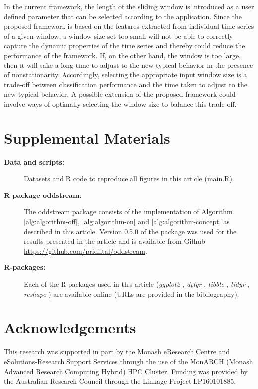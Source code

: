 \documentclass[12pt]{article}
\begin{document}
In the current framework, the length of the sliding window is introduced
as a user defined parameter that can be selected according to the
application. Since the proposed framework is based on the features
extracted from individual time series of a given window, a window size
set too small will not be able to correctly capture the dynamic
properties of the time series and thereby could reduce the performance
of the framework. If, on the other hand, the window is too large, then
it will take a long time to adjust to the new typical behavior in the
presence of nonstationarity. Accordingly, selecting the appropriate
input window size is a trade-off between classification performance and
the time taken to adjust to the new typical behavior. A possible
extension of the proposed framework could involve ways of optimally
selecting the window size to balance this trade-off.

\hypertarget{supplemental-materials}{%
\section{Supplemental Materials}\label{supplemental-materials}}

\begin{description}

\item[\textbf{Data and scripts:}] Datasets and R code to reproduce all figures in this article (main.R).

\item[\textbf{R package oddstream:}] The oddstream package \citep{Roddstream} consists of the implementation of Algorithm \ref{alg:algorithm-off}, \ref{alg:algorithm-on} and \ref{alg:algorithm-concept} as described in this article. Version 0.5.0 of the package was used for the results presented in the article and is available from Github \url{https://github.com/pridiltal/oddstream}.

\item[\textbf{R-packages:}] Each of the R packages used in this article
(\textit{ggplot2} \citep{Rggplot2009},
\textit{dplyr} \citep{Rdplyr2017},
\textit{tibble} \citep{Rtibble2017},
\textit{tidyr} \citep{Rtidyr2017},
\textit{reshape} \citep{Rreshape2007})
are available online (URLs are provided in the bibliography).

\end{description}

\hypertarget{acknowledgements}{%
\section*{Acknowledgements}\label{acknowledgements}}

This research was supported in part by the Monash eResearch Centre and
eSolutions-Research Support Services through the use of the MonARCH
(Monash Advanced Research Computing Hybrid) HPC Cluster. Funding was
provided by the Australian Research Council through the Linkage Project
LP160101885.



\end{document}
